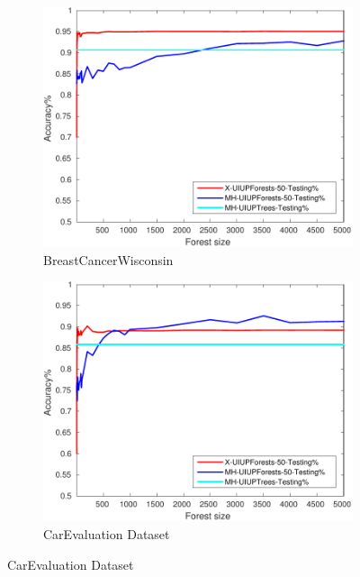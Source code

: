 \begin{figure}[ht]
	\centering

  \begin{subfigure}[b]{0.3\textwidth}
		\centering
		\includegraphics[width=\textwidth]{figs/PLPTF/Forests/BreastCancerWisconsinDownsampled_Forests_X_MH.pdf}
		\caption{BreastCancerWisconsin}
		\label{fig:B3}
	\end{subfigure}
  \begin{subfigure}[b]{0.3\textwidth}
		\centering
  	\includegraphics[width=\textwidth]{figs/PLPTF/Forests/CarEvaluation_Forests_X_MH.pdf}
  	\caption{CarEvaluation Dataset}
		\label{fig:Car3}
	\end{subfigure}

\end{figure}
